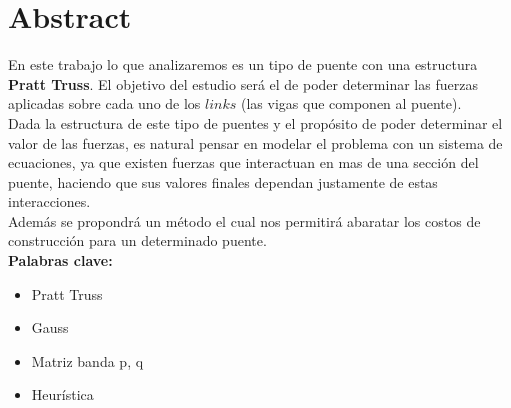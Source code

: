 \section{Abstract}

En este trabajo lo que analizaremos es un tipo de puente con una estructura {\bf Pratt Truss}. El objetivo del estudio será el de poder determinar las fuerzas aplicadas sobre cada uno de los $links$ (las vigas que componen al puente).\\

Dada la estructura de este tipo de puentes y el propósito de poder determinar el valor de las fuerzas, es natural pensar en modelar el problema con un sistema de ecuaciones, ya que existen fuerzas que interactuan en mas de una sección del puente, haciendo que sus valores finales dependan justamente de estas interacciones.\\

Además se propondrá un método el cual nos permitirá abaratar los costos de construcción para un determinado puente.\\

{\bf Palabras clave:}
\begin{itemize}
    \item Pratt Truss
    \item Gauss
    \item Matriz banda p, q
    \item Heurística
\end{itemize}
